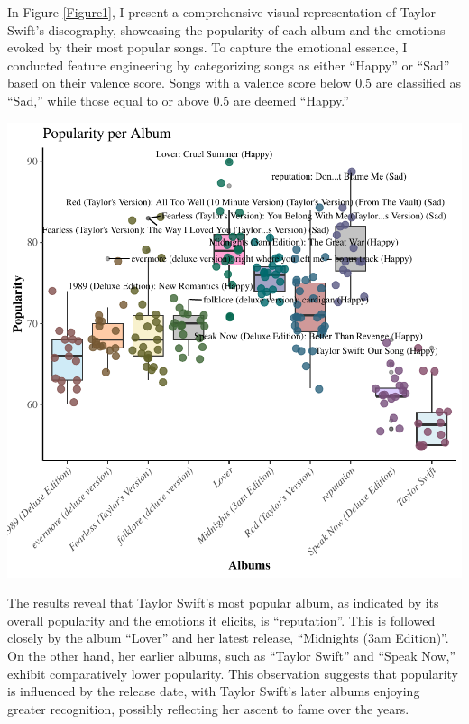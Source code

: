 \documentclass[11pt,preprint, authoryear]{elsarticle}
\let\origfigure\figure
\let\endorigfigure\endfigure
\renewenvironment{figure}[1][2] {
    \expandafter\origfigure\expandafter[H]
} {
    \endorigfigure
}
\numberwithin{equation}{section}
\numberwithin{figure}{section}
\numberwithin{table}{section}
\begin{document}
In Figure \ref{Figure1}, I present a comprehensive visual representation
of Taylor Swift's discography, showcasing the popularity of each album
and the emotions evoked by their most popular songs. To capture the
emotional essence, I conducted feature engineering by categorizing songs
as either ``Happy'' or ``Sad'' based on their valence score. Songs with
a valence score below 0.5 are classified as ``Sad,'' while those equal
to or above 0.5 are deemed ``Happy.''

\begin{figure}[H]

{\centering \includegraphics{Taylor-Swift-Report_files/figure-latex/Figure1-1} 

}

\caption{Popularity per Album \label{Figure1}}\label{fig:Figure1}
\end{figure}

The results reveal that Taylor Swift's most popular album, as indicated
by its overall popularity and the emotions it elicits, is
``reputation''. This is followed closely by the album ``Lover'' and her
latest release, ``Midnights (3am Edition)''. On the other hand, her
earlier albums, such as ``Taylor Swift'' and ``Speak Now,'' exhibit
comparatively lower popularity. This observation suggests that
popularity is influenced by the release date, with Taylor Swift's later
albums enjoying greater recognition, possibly reflecting her ascent to
fame over the years.
\end{document}
